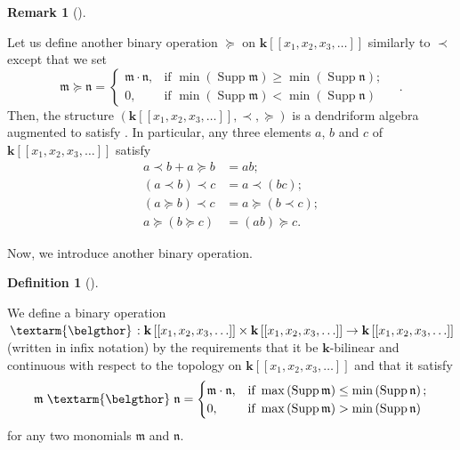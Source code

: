 \documentclass
[numbers=enddot,12pt,final,onecolumn,notitlepage,abstracton]{scrartcl}%
\theoremstyle{definition}
\newtheorem{defi}[theo]{Definition}
\newenvironment{definition}[1][]
{\begin{defi}[#1]\begin{leftbar}}
{\end{leftbar}\end{defi}}
\newtheorem{remk}[theo]{Remark}
\newenvironment{remark}[1][]
{\begin{remk}[#1]\begin{leftbar}}
{\end{leftbar}\end{remk}}
\newcommand{\bel}{\left. \textarm{\belgthor} \right.}
\begin{document}
\begin{remark}
\label{rmk.dendri}Let us define another binary operation $\left.
\succeq\right.  $ on $\mathbf{k}\left[  \left[  x_{1},x_{2},x_{3}%
,\ldots\right]  \right]  $ similarly to $\left.  \prec\right.  $ except that
we set%
\[
\mathfrak{m}\left.  \succeq\right.  \mathfrak{n}=
\begin{cases}
\mathfrak{m}\cdot\mathfrak{n}, & \text{if }\min\left(  \operatorname*{Supp}%
\mathfrak{m}\right)  \geq\min\left(  \operatorname*{Supp}\mathfrak{n}\right)
;\\
0, & \text{if }\min\left(  \operatorname*{Supp}\mathfrak{m}\right)
<\min\left(  \operatorname*{Supp}\mathfrak{n}\right)
\end{cases}
\quad.
\]
Then, the structure $\left(  \mathbf{k}\left[  \left[  x_{1},x_{2}%
,x_{3},\ldots\right]  \right]  ,\left.  \prec\right.  , \left.  \succeq
\right.  \right)  $ is a dendriform algebra augmented to satisfy
\cite[(15)]{EbrFar08}. In particular, any three elements $a$, $b$ and $c$ of
$\mathbf{k}\left[  \left[  x_{1},x_{2},x_{3},\ldots\right]  \right]  $ satisfy%
\begin{align*}
a\left.  \prec\right.  b+a \left.  \succeq\right.  b  &  =ab;\\
\left(  a\left.  \prec\right.  b\right)  \left.  \prec\right.  c  &  =a\left.
\prec\right.  \left(  bc\right)  ;\\
\left(  a\left.  \succeq\right.  b\right)  \left.  \prec\right.  c  &
=a\left.  \succeq\right.  \left(  b\left.  \prec\right.  c\right)  ;\\
a\left.  \succeq\right.  \left(  b\left.  \succeq\right.  c\right)   &
=\left(  ab\right)  \left.  \succeq\right.  c.
\end{align*}

\end{remark}

Now, we introduce another binary operation.

\begin{definition}
\label{def.belgthor}We define a binary operation $\bel :\mathbf{k}\left[
\left[  x_{1},x_{2},x_{3},\ldots\right]  \right]  \times\mathbf{k}\left[
\left[  x_{1},x_{2},x_{3},\ldots\right]  \right]  \rightarrow\mathbf{k}\left[
\left[  x_{1},x_{2},x_{3},\ldots\right]  \right]  $ (written in infix
notation) by the requirements that it be $\mathbf{k}$-bilinear and continuous
with respect to the topology on $\mathbf{k}\left[  \left[  x_{1},x_{2}%
,x_{3},\ldots\right]  \right]  $ and that it satisfy%
\[
\mathfrak{m} \bel \mathfrak{n}=
\begin{cases}
\mathfrak{m}\cdot\mathfrak{n}, & \text{if }\max\left(  \operatorname*{Supp}%
\mathfrak{m}\right)  \leq\min\left(  \operatorname*{Supp}\mathfrak{n}\right)
;\\
0, & \text{if }\max\left(  \operatorname*{Supp}\mathfrak{m}\right)
>\min\left(  \operatorname*{Supp}\mathfrak{n}\right)
\end{cases}
\]
for any two monomials $\mathfrak{m}$ and $\mathfrak{n}$.
\end{definition}
\end{document}
